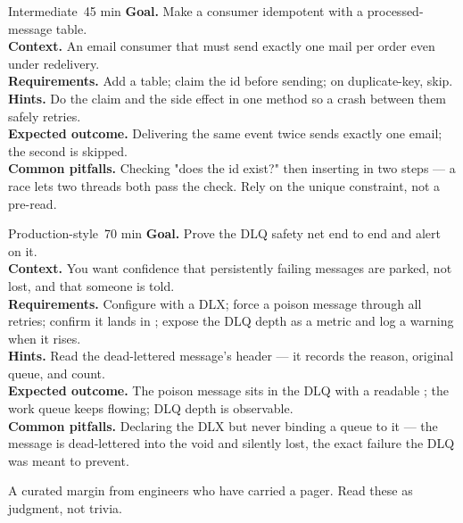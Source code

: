 \begin{minilab}{Intermediate}{~45 min}
\textbf{Goal.} Make a consumer idempotent with a processed-message table.\\
\textbf{Context.} An email consumer that must send exactly one mail per order even under redelivery.\\
\textbf{Requirements.} Add a  table; claim the id before sending; on duplicate-key, skip.\\
\textbf{Hints.} Do the claim and the side effect in one  method so a crash between them safely retries.\\
\textbf{Expected outcome.} Delivering the same event twice sends exactly one email; the second is skipped.\\
\textbf{Common pitfalls.} Checking "does the id exist?" then inserting in two steps --- a race lets two threads both pass the check. Rely on the unique constraint, not a pre-read.
\end{minilab}

\begin{minilab}{Production-style}{~70 min}
\textbf{Goal.} Prove the DLQ safety net end to end and alert on it.\\
\textbf{Context.} You want confidence that persistently failing messages are parked, not lost, and that someone is told.\\
\textbf{Requirements.} Configure  with a DLX; force a poison message through all retries; confirm it lands in ; expose the DLQ depth as a metric and log a warning when it rises.\\
\textbf{Hints.} Read the dead-lettered message's  header --- it records the reason, original queue, and count.\\
\textbf{Expected outcome.} The poison message sits in the DLQ with a readable ; the work queue keeps flowing; DLQ depth is observable.\\
\textbf{Common pitfalls.} Declaring the DLX but never binding a queue to it --- the message is dead-lettered into the void and silently lost, the exact failure the DLQ was meant to prevent.
\end{minilab}


A curated margin from engineers who have carried a pager. Read these as judgment, not trivia.

